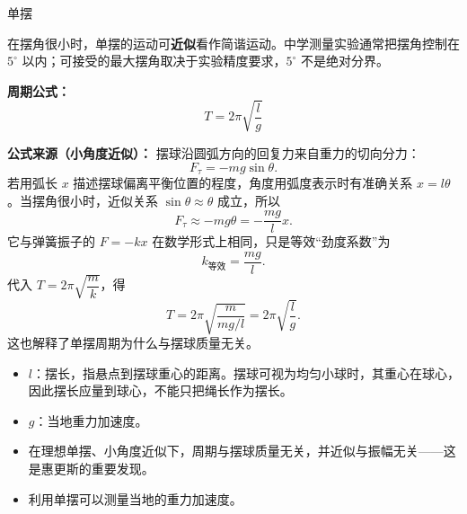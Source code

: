 \begin{conceptbox}{单摆}

在摆角很小时，单摆的运动可\textbf{近似}看作简谐运动。中学测量实验通常把摆角控制在 $5^\circ$ 以内；可接受的最大摆角取决于实验精度要求，$5^\circ$ 不是绝对分界。

\begin{center}


\label{fig:pendulum}
\end{center}

\textbf{周期公式：}
\[
\boxed{T = 2\pi\sqrt{\frac{l}{g}}}
\]

\textbf{公式来源（小角度近似）：}
摆球沿圆弧方向的回复力来自重力的切向分力：
\[
F_{\tau}=-mg\sin\theta.
\]
若用弧长 $x$ 描述摆球偏离平衡位置的程度，角度用弧度表示时有准确关系 $x=l\theta$。当摆角很小时，近似关系 $\sin\theta\approx\theta$ 成立，所以
\[
F_{\tau}\approx-mg\theta=-\frac{mg}{l}x.
\]
它与弹簧振子的 $F=-kx$ 在数学形式上相同，只是等效“劲度系数”为
\[
k_{\text{等效}}=\frac{mg}{l}.
\]
代入 $T=2\pi\sqrt{\dfrac{m}{k}}$，得
\[
T=2\pi\sqrt{\frac{m}{mg/l}}=2\pi\sqrt{\frac{l}{g}}.
\]
这也解释了单摆周期为什么与摆球质量无关。

\begin{itemize}
  \item $l$：摆长，指悬点到摆球重心的距离。摆球可视为均匀小球时，其重心在球心，因此摆长应量到球心，不能只把绳长作为摆长。
  \item $g$：当地重力加速度。
  \item 在理想单摆、小角度近似下，周期与摆球质量无关，并近似与振幅无关——这是惠更斯的重要发现。
  \item 利用单摆可以测量当地的重力加速度。
\end{itemize}

\end{conceptbox}

